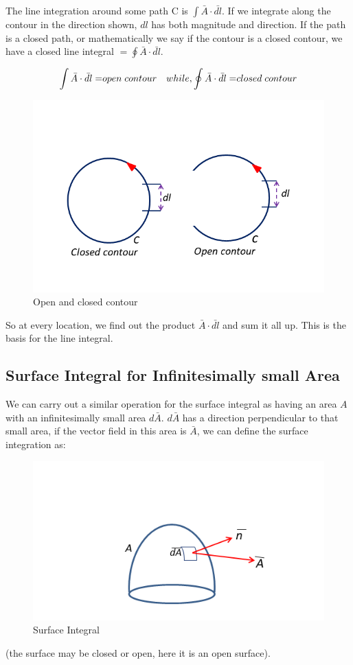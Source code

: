 The line integration around some path C is ${\displaystyle \int  \bar{A} \cdot \bar{dl}}$. If we integrate along the contour in the direction shown, $dl$ has both magnitude and direction. If the path is a closed path, or mathematically we say if the contour is a closed contour, we have a closed line integral $= {\displaystyle \oint  \bar{A} \cdot \bar{dl}}$.

\begin{equation}
{\displaystyle \int  \bar{A} \cdot \bar{dl} = }open\; contour\quad while, \newline  {\displaystyle \oint  \bar{A} \cdot \bar{dl}= }closed\; contour
\end{equation}
\begin{figure}
\centering
\includegraphics[width=0.9\linewidth]{graphics/fig17.4}
\caption{Open and closed contour}
\end{figure}

So at every location, we find out the product $\bar{A} \cdot \bar{dl}$ and sum it all up. This is the basis for the line integral.
\subsection{Surface Integral for Infinitesimally small Area}
We can carry out a similar operation for the surface integral as having an area $A$ with an infinitesimally small area $d\bar{A}$. $d\bar{A}$ has a direction perpendicular to that small area, if the vector field in this area is $\bar{A}$, we can define the surface integration as:
\begin{figure}
\centering
\includegraphics[width=1\linewidth]{graphics/surface_Int}
\caption{Surface Integral}
\end{figure}
(the surface may be closed or open, here it is an open surface).

